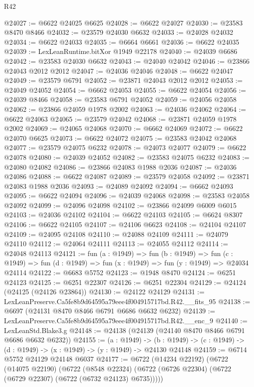 \begin{lexlean}{R42}
\begin{coremodule}
{@24027 := @6622 @24025 @6625
@24028 := @6622 @24027
@24030 := @23583 @8470 @8466
@24032 := @23579 @24030 @6632
@24033 := @24028 @24032
@24034 := @6622 @24033
@24035 := @6664 @6661
@24036 := @6622 @24035
@24039 := LexLeanRuntime.bitXor @1949 @22178
@24040 := @24039 @6686
@24042 := @23583 @24030 @6632
@24043 := @24040 @24042
@24046 := @23866 @24043 @2012 @2012
@24047 := @24036 @24046
@24048 := @6622 @24047
@24049 := @23579 @6791
@24052 := @23871 @24043 @2012 @2012
@24053 := @24049 @24052
@24054 := @6662 @24053
@24055 := @6622 @24054
@24056 := @24039 @8466
@24058 := @23583 @6791 @24052
@24059 := @24056 @24058
@24062 := @23866 @24059 @1978 @2002
@24063 := @24036 @24062
@24064 := @6622 @24063
@24065 := @23579 @24042
@24068 := @23871 @24059 @1978 @2002
@24069 := @24065 @24068
@24070 := @6662 @24069
@24072 := @6622 @24070 @6625
@24073 := @6622 @24072
@24075 := @23583 @24042 @24068
@24077 := @23579 @24075 @6232
@24078 := @24073 @24077
@24079 := @6622 @24078
@24080 := @24039 @24052
@24082 := @23583 @24075 @6232
@24083 := @24080 @24082
@24086 := @23866 @24083 @1988 @2036
@24087 := @24036 @24086
@24088 := @6622 @24087
@24089 := @23579 @24058
@24092 := @23871 @24083 @1988 @2036
@24093 := @24089 @24092
@24094 := @6662 @24093
@24095 := @6622 @24094
@24096 := @24039 @24068
@24098 := @23583 @24058 @24092
@24099 := @24096 @24098
@24102 := @23866 @24099 @6009 @6015
@24103 := @24036 @24102
@24104 := @6622 @24103
@24105 := @6624 @8307
@24106 := @6622 @24105
@24107 := @24106 @6623
@24108 := @24104 @24107
@24109 := @24095 @24108
@24110 := @24088 @24109
@24111 := @24079 @24110
@24112 := @24064 @24111
@24113 := @24055 @24112
@24114 := @24048 @24113
@24121 := fun (a : @1949) =>
  fun (b : @1949) =>
  fun (c : @1949) => fun (d : @1949) => fun (x : @1949) => fun (y : @1949) => @24034 @24114
@24122 := @6683 @5752
@24123 := @1948 @8470
@24124 := @6251 @24123
@24125 := @6251 @22307
@24126 := @6251 @22304
@24129 := @24124 (@24125 (@24126 @23864))
@24130 := @24122 @24129
@24131 := LexLeanPreserve.Ca5fe8b9d64595a79eee4f004915717bd.R42.__fits_95
@24138 := @6697 (@24131 @8470 @8466 @6791 @6686 @6632 @6232)
@24139 := LexLeanPreserve.Ca5fe8b9d64595a79eee4f004915717bd.R42.__enc_9
@24140 := LexLeanStd.Blake3.g
@24148 := @24138 (@24139 (@24140 @8470 @8466 @6791 @6686 @6632 @6232))
@24155 := (a : @1949) ->
  (b : @1949) -> (c : @1949) -> (d : @1949) -> (x : @1949) -> (y : @1949) -> @24130 @24148
@24159 := @6714 @5752 @24129 @24148 @6037
@24177 := @6722
    (@14234 @22192)
    (@6722
      (@14075 @22190)
      (@6722
        (@8548 @22324)
        (@6722 (@6726 @22304) (@6722 (@6729 @22307) (@6722 (@6732 @24123) @6735)))))
}
\end{coremodule}
\end{lexlean}
